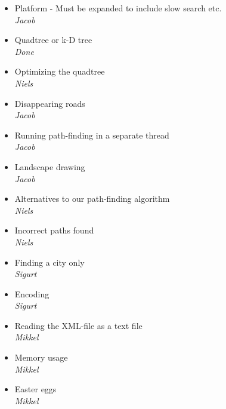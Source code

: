 \begin{itemize}
	\item Platform - Must be expanded to include slow search etc. \\
		\textsl{Jacob}
	\item Quadtree or k-D tree \\
		\textsl{Done}
	\item Optimizing the quadtree \\
		\textsl{Niels}
	\item Disappearing roads \\
		\textsl{Jacob}
	\item Running path-finding in a separate thread \\
		\textsl{Jacob}
	\item Landscape drawing \\
		\textsl{Jacob}
	\item Alternatives to our path-finding algorithm \\
		\textsl{Niels}
	\item Incorrect paths found \\
		\textsl{Niels}
	\item Finding a city only \\
		\textsl{Sigurt}
	\item Encoding \\
		\textsl{Sigurt}
	\item Reading the XML-file as a text file \\
		\textsl{Mikkel}
	\item Memory usage \\
		\textsl{Mikkel}
	\item Easter eggs \\
		\textsl{Mikkel}
\end{itemize}